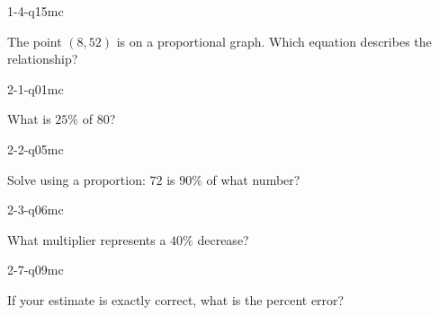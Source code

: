 
\begin{practiceQuestion}{1-4-q15}{mc}
\begin{questionText}
The point $(8, 52)$ is on a proportional graph. Which equation describes the relationship?
\end{questionText}
\end{practiceQuestion}

\begin{practiceQuestion}{2-1-q01}{mc}
\begin{questionText}
What is $25\%$ of $80$?
\end{questionText}
\end{practiceQuestion}

\begin{practiceQuestion}{2-2-q05}{mc}
\begin{questionText}
Solve using a proportion: $72$ is $90\%$ of what number?
\end{questionText}
\end{practiceQuestion}

\begin{practiceQuestion}{2-3-q06}{mc}
\begin{questionText}
What multiplier represents a $40\%$ decrease?
\end{questionText}
\end{practiceQuestion}

\begin{practiceQuestion}{2-7-q09}{mc}
\begin{questionText}
If your estimate is exactly correct, what is the percent error?
\end{questionText}
\end{practiceQuestion}

